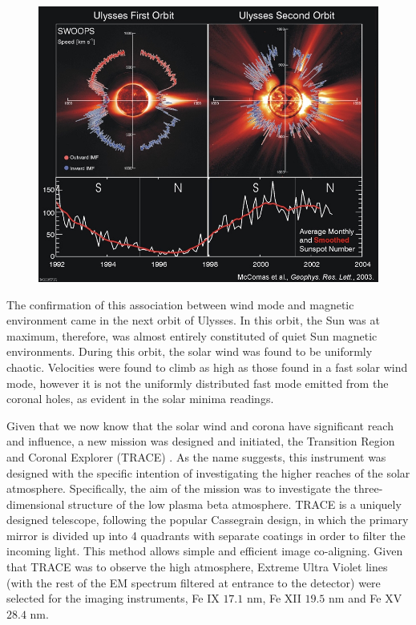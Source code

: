 \begin{figure}
	\includegraphics[scale=0.5]{Chapter1/Figs/ulysses_solar_wind}
	\caption{\cite{McComas2003}}
	\label{fig:ulysses_sw}
\end{figure}

The confirmation of this association between wind mode and magnetic environment came in the next orbit of Ulysses.
In this orbit, the Sun was at maximum, therefore, was almost entirely constituted of quiet Sun magnetic environments.
During this orbit, the solar wind was found to be uniformly chaotic.
Velocities were found to climb as high as those found in a fast solar wind mode, however it is not the uniformly distributed fast mode emitted from the coronal holes, as evident in the solar minima readings.

Given that we now know that the solar wind and corona have significant reach and influence, a new mission was designed and initiated, the Transition Region and Coronal Explorer (TRACE) \cite{Gaeng1998}.
As the name suggests, this instrument was designed with the specific intention of investigating the higher reaches of the solar atmosphere.
Specifically, the aim of the mission was to investigate the three-dimensional structure of the low plasma beta atmosphere.
TRACE is a uniquely designed telescope, following the popular Cassegrain design, in which the primary mirror is divided up into 4 quadrants with separate coatings in order to filter the incoming light.
This method allows simple and efficient image co-aligning.
Given that TRACE was to observe the high atmosphere, Extreme Ultra Violet lines (with the rest of the EM spectrum filtered at entrance to the detector) were selected for the imaging instruments, Fe IX $17.1$ nm, Fe XII $19.5$ nm and Fe XV $28.4$ nm.




